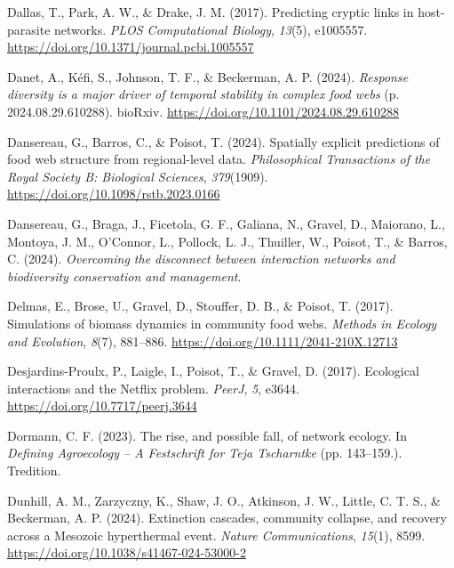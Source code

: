 \documentclass[
]{article}
\newlength{\cslhangindent}
\newenvironment{CSLReferences}[2] %
 {\begin{list}{}{%
  \setlength{\itemindent}{0pt}
  \setlength{\leftmargin}{0pt}
  \setlength{\parsep}{0pt}
  \ifodd #1
   \setlength{\leftmargin}{\cslhangindent}
   \setlength{\itemindent}{-1\cslhangindent}
  \fi
  \setlength{\itemsep}{#2\baselineskip}}}
 {\end{list}}
\begin{document}
\begin{CSLReferences}{1}{0}
Dallas, T., Park, A. W., \& Drake, J. M. (2017). Predicting cryptic
links in host-parasite networks. \emph{PLOS Computational Biology},
\emph{13}(5), e1005557.
\url{https://doi.org/10.1371/journal.pcbi.1005557}

Danet, A., Kéfi, S., Johnson, T. F., \& Beckerman, A. P. (2024).
\emph{Response diversity is a major driver of temporal stability in
complex food webs} (p. 2024.08.29.610288). bioRxiv.
\url{https://doi.org/10.1101/2024.08.29.610288}

Dansereau, G., Barros, C., \& Poisot, T. (2024). Spatially explicit
predictions of food web structure from regional-level data.
\emph{Philosophical Transactions of the Royal Society B: Biological
Sciences}, \emph{379}(1909).
\url{https://doi.org/10.1098/rstb.2023.0166}

Dansereau, G., Braga, J., Ficetola, G. F., Galiana, N., Gravel, D.,
Maiorano, L., Montoya, J. M., O'Connor, L., Pollock, L. J., Thuiller,
W., Poisot, T., \& Barros, C. (2024). \emph{Overcoming the disconnect
between interaction networks and biodiversity conservation and
management}.

Delmas, E., Brose, U., Gravel, D., Stouffer, D. B., \& Poisot, T.
(2017). Simulations of biomass dynamics in community food webs.
\emph{Methods in Ecology and Evolution}, \emph{8}(7), 881--886.
\url{https://doi.org/10.1111/2041-210X.12713}

Desjardins-Proulx, P., Laigle, I., Poisot, T., \& Gravel, D. (2017).
Ecological interactions and the {Netflix} problem. \emph{PeerJ},
\emph{5}, e3644. \url{https://doi.org/10.7717/peerj.3644}

Dormann, C. F. (2023). The rise, and possible fall, of network ecology.
In \emph{Defining {Agroecology} -- {A Festschrift} for {Teja
Tscharntke}} (pp. 143--159.). Tredition.

Dunhill, A. M., Zarzyczny, K., Shaw, J. O., Atkinson, J. W., Little, C.
T. S., \& Beckerman, A. P. (2024). Extinction cascades, community
collapse, and recovery across a {Mesozoic} hyperthermal event.
\emph{Nature Communications}, \emph{15}(1), 8599.
\url{https://doi.org/10.1038/s41467-024-53000-2}


\end{CSLReferences}
\end{document}
